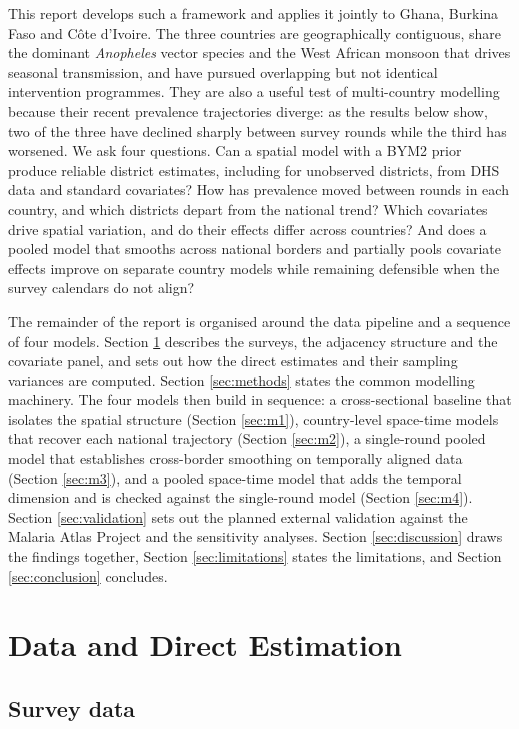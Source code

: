\documentclass{article}
\begin{document}
This report develops such a framework and applies it jointly to Ghana,
Burkina Faso and Côte d'Ivoire. The three countries are geographically
contiguous, share the dominant \emph{Anopheles} vector species and the
West African monsoon that drives seasonal transmission, and have pursued
overlapping but not identical intervention programmes. They are also a
useful test of multi-country modelling because their recent prevalence
trajectories diverge: as the results below show, two of the three have
declined sharply between survey rounds while the third has worsened. We
ask four questions. Can a spatial model with a BYM2 prior produce
reliable district estimates, including for unobserved districts, from
DHS data and standard covariates? How has prevalence moved between
rounds in each country, and which districts depart from the national
trend? Which covariates drive spatial variation, and do their effects
differ across countries? And does a pooled model that smooths across
national borders and partially pools covariate effects improve on
separate country models while remaining defensible when the survey
calendars do not align?

The remainder of the report is organised around the data pipeline and a
sequence of four models. Section \ref{sec:data} describes the surveys,
the adjacency structure and the covariate panel, and sets out how the
direct estimates and their sampling variances are computed. Section
\ref{sec:methods} states the common modelling machinery. The four models
then build in sequence: a cross-sectional baseline that isolates the
spatial structure (Section \ref{sec:m1}), country-level space-time
models that recover each national trajectory (Section \ref{sec:m2}), a
single-round pooled model that establishes cross-border smoothing on
temporally aligned data (Section \ref{sec:m3}), and a pooled space-time
model that adds the temporal dimension and is checked against the
single-round model (Section \ref{sec:m4}). Section \ref{sec:validation}
sets out the planned external validation against the Malaria Atlas
Project and the sensitivity analyses. Section \ref{sec:discussion} draws
the findings together, Section \ref{sec:limitations} states the
limitations, and Section \ref{sec:conclusion} concludes.

\section{Data and Direct Estimation}\label{sec:data}

\subsection{Survey data}\label{survey-data}
\end{document}
